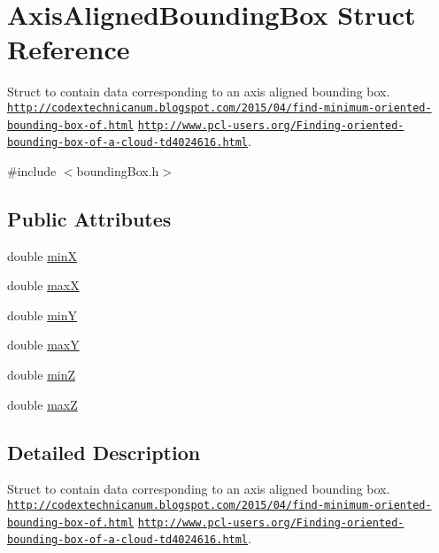 \hypertarget{structAxisAlignedBoundingBox}{\section{Axis\-Aligned\-Bounding\-Box Struct Reference}
\label{structAxisAlignedBoundingBox}
}


Struct to contain data corresponding to an axis aligned bounding box. \href{http://codextechnicanum.blogspot.com/2015/04/find-minimum-oriented-bounding-box-of.html}{\tt http\-://codextechnicanum.\-blogspot.\-com/2015/04/find-\/minimum-\/oriented-\/bounding-\/box-\/of.\-html} \href{http://www.pcl-users.org/Finding-oriented-bounding-box-of-a-cloud-td4024616.html}{\tt http\-://www.\-pcl-\/users.\-org/\-Finding-\/oriented-\/bounding-\/box-\/of-\/a-\/cloud-\/td4024616.\-html}.  




{\ttfamily \#include $<$bounding\-Box.\-h$>$}

\subsection*{Public Attributes}
\begin{DoxyCompactItemize}
\item 
double \hyperlink{structAxisAlignedBoundingBox_ada87f37705b4e4c7309e8fa366cb6fbd}{min\-X}
\item 
double \hyperlink{structAxisAlignedBoundingBox_aefab04736fe96b24409238e74c1ed5f7}{max\-X}
\item 
double \hyperlink{structAxisAlignedBoundingBox_a518f2450583f7704cd1810f834e1bcf1}{min\-Y}
\item 
double \hyperlink{structAxisAlignedBoundingBox_a802025b881a796386f3a97f5b5ca3322}{max\-Y}
\item 
double \hyperlink{structAxisAlignedBoundingBox_a30f19d9aa28abba5ae6025a649c0c7b2}{min\-Z}
\item 
double \hyperlink{structAxisAlignedBoundingBox_ac950610df58a2d1531f2e8859a688ede}{max\-Z}
\end{DoxyCompactItemize}


\subsection{Detailed Description}
Struct to contain data corresponding to an axis aligned bounding box. \href{http://codextechnicanum.blogspot.com/2015/04/find-minimum-oriented-bounding-box-of.html}{\tt http\-://codextechnicanum.\-blogspot.\-com/2015/04/find-\/minimum-\/oriented-\/bounding-\/box-\/of.\-html} \href{http://www.pcl-users.org/Finding-oriented-bounding-box-of-a-cloud-td4024616.html}{\tt http\-://www.\-pcl-\/users.\-org/\-Finding-\/oriented-\/bounding-\/box-\/of-\/a-\/cloud-\/td4024616.\-html}. 


